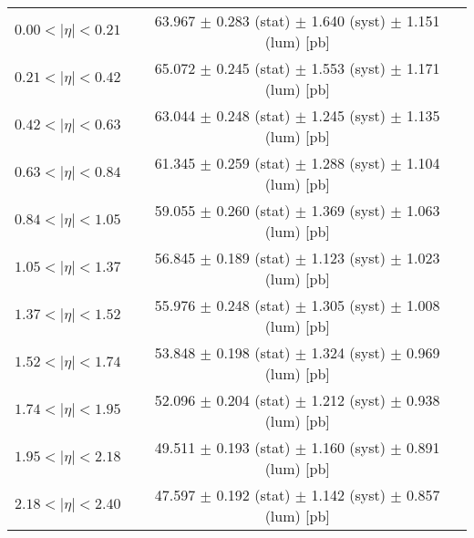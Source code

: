 \begin{tabular}{lc}
\hline
$0.00 < |\eta| <0.21$          & 63.967 $\pm$ 0.283 (stat) $\pm$ 1.640 (syst) $\pm$ 1.151 (lum) [pb]  \\
$0.21 < |\eta| <0.42$          & 65.072 $\pm$ 0.245 (stat) $\pm$ 1.553 (syst) $\pm$ 1.171 (lum) [pb]  \\
$0.42 < |\eta| <0.63$          & 63.044 $\pm$ 0.248 (stat) $\pm$ 1.245 (syst) $\pm$ 1.135 (lum) [pb]  \\
$0.63 < |\eta| <0.84$          & 61.345 $\pm$ 0.259 (stat) $\pm$ 1.288 (syst) $\pm$ 1.104 (lum) [pb]  \\
$0.84 < |\eta| <1.05$          & 59.055 $\pm$ 0.260 (stat) $\pm$ 1.369 (syst) $\pm$ 1.063 (lum) [pb]  \\
$1.05 < |\eta| <1.37$          & 56.845 $\pm$ 0.189 (stat) $\pm$ 1.123 (syst) $\pm$ 1.023 (lum) [pb]  \\
$1.37 < |\eta| <1.52$          & 55.976 $\pm$ 0.248 (stat) $\pm$ 1.305 (syst) $\pm$ 1.008 (lum) [pb]  \\
$1.52 < |\eta| <1.74$          & 53.848 $\pm$ 0.198 (stat) $\pm$ 1.324 (syst) $\pm$ 0.969 (lum) [pb]  \\
$1.74 < |\eta| <1.95$          & 52.096 $\pm$ 0.204 (stat) $\pm$ 1.212 (syst) $\pm$ 0.938 (lum) [pb]  \\
$1.95 < |\eta| <2.18$          & 49.511 $\pm$ 0.193 (stat) $\pm$ 1.160 (syst) $\pm$ 0.891 (lum) [pb]  \\
$2.18 < |\eta| <2.40$          & 47.597 $\pm$ 0.192 (stat) $\pm$ 1.142 (syst) $\pm$ 0.857 (lum) [pb]  \\
\hline
\end{tabular}
